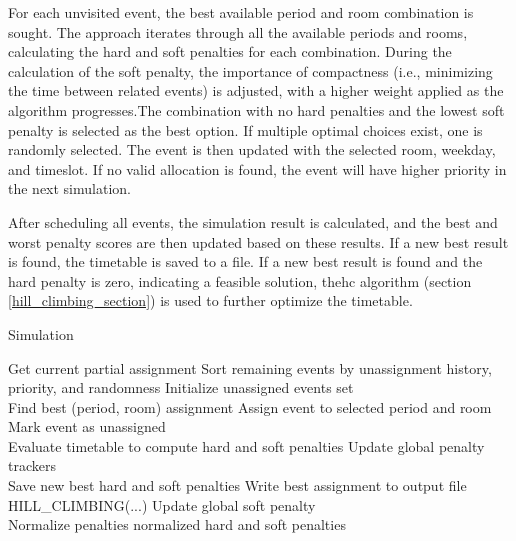 For each unvisited event, the best available period and room combination is sought. The approach iterates through all the available periods and rooms, calculating the hard and soft penalties for each combination. During the calculation of the soft penalty, the importance of compactness (i.e., minimizing the time between related events) is adjusted, with a higher weight applied as the algorithm progresses.The combination with no hard penalties and the lowest soft penalty is selected as the best option. If multiple optimal choices exist, one is randomly selected. The event is then updated with the selected room, weekday, and timeslot. If no valid allocation is found, the event will have higher priority in the next simulation.

After scheduling all events, the simulation result is calculated, and the best and worst penalty scores are then updated based on these results. If a new best result is found, the timetable is saved to a file. If a new best result is found and the hard penalty is zero, indicating a feasible solution, the\ac{hc} algorithm (section \ref{hill_climbing_section}) is used to further optimize the timetable.

\begin{algorithm}
\caption{Simulation}\label{simulation}
\begin{algorithmic}[1]
    \State Get current partial assignment
    \State Sort remaining events by unassignment history, priority, and randomness
    \State Initialize unassigned events set
\\
        \State Find best (period, room) assignment
            \State Assign event to selected period and room
        \Else
            \State Mark event as unassigned
        \EndIf
    \EndFor
\\
    \State Evaluate timetable to compute hard and soft penalties
    \State Update global penalty trackers
\\
        \State Save new best hard and soft penalties
        \State Write best assignment to output file
            \State HILL\_CLIMBING(...)
            \State Update global soft penalty
        \EndIf
    \EndIf
\\
    \State Normalize penalties
    \State \Return normalized hard and soft penalties
\EndFunction
\end{algorithmic}
\end{algorithm}

